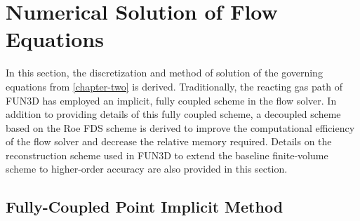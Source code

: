\chapter{Numerical Solution of Flow Equations}
\label{chapter-three}

In this section, the discretization and method of solution of the governing
equations from \cref{chapter-two} is derived.  Traditionally, the reacting gas
path of FUN3D\cite{biedron2016fun3d} has employed an implicit, fully coupled
scheme in the flow solver.  In addition to providing details of this fully
coupled scheme, a decoupled scheme based on the Roe FDS scheme\cite{roe} is
derived to improve the computational efficiency of the flow solver and decrease
the relative memory required.  Details on the reconstruction scheme used in
FUN3D to extend the baseline finite-volume scheme to higher-order accuracy are
also provided in this section.

\section{Fully-Coupled Point Implicit Method}

